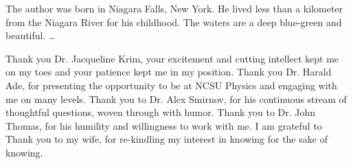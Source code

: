 \begin{biography}
The author was born in Niagara Falls, New York. He lived less than a kilometer from the Niagara River for his childhood. The waters are a deep blue-green and beautiful. \ldots
\end{biography}

\begin{acknowledgements}
Thank you Dr. Jacqueline Krim, your excitement and cutting intellect kept me on my toes and your patience kept me in my position. Thank you Dr. Harald Ade, for presenting the opportunity to be at NCSU Physics and engaging with me on many levels. Thank you to Dr. Alex Smirnov, for his continuous stream of thoughtful questions, woven through with humor. Thank you to Dr. John Thomas, for his humility and willingness to work with me. I am grateful to Thank you to my wife, for re-kindling my interest in knowing for the sake of knowing.
\end{acknowledgements}

\thesistableofcontents



\thesislistoftables

\thesislistoffigures
